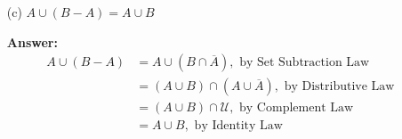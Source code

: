 \documentclass[14pt]{extreport}
\newcommand{\answer}[0]{\medskip \textbf{Answer:} \medskip}
\newcommand{\union}[0]{\cup}
\newcommand{\intersect}[0]{\cap}
\begin{document}
\begin{enumerate}
\begin{enumerate}
            \item[(c)] \( A \union (B - A) = A \union B \)
            
                \answer
                \begin{align*}
                    A \union (B - A) &= A \union (B \intersect \overline{A}), \text{ by Set Subtraction Law} \\
                                     &= (A \union B) \intersect (A \union \overline{A}), \text{ by Distributive Law} \\
                                     &= (A \union B) \intersect \mathcal{U}, \text{ by Complement Law} \\
                                     &= A \union B, \text{ by Identity Law}
                \end{align*}
        \end{enumerate}
\end{enumerate}
\end{document}
